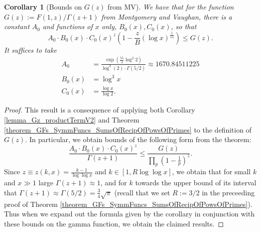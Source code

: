 \documentclass[11pt,reqno,a4letter]{article}
\numberwithin{figure}{section}
\numberwithin{table}{section}
\theoremstyle{plain}
\newtheorem{cor}[theorem]{Corollary}
\numberwithin{theorem}{section}
\theoremstyle{definition}
\begin{document}
\begin{cor}[Bounds on $G(z)$ from MV] 
\label{cor_BoundsOnGz_FromMVBook_initial_stmt_v1} 
We have that for the function $G(z) := F(1, z) / \Gamma(z+1)$ from Montgomery and Vaughan, there 
is a constant $A_0$ and functions of $x$ only, $B_0(x), C_0(x)$, so that 
\[
A_0 \cdot B_0(x) \cdot C_0(x)^{z} \left(1 - \frac{z}{B} (\log x)^{\frac{1}{14}}\right) \leq G(z). 
\]
It suffices to take 
\begin{align*} 
A_0 & = \frac{\exp\left(\frac{55}{4} \log^2 2\right)}{\log^3(2) \cdot \Gamma(5/2)} 
     \approx 1670.84511225 \\ 
B_0(x) & = \log^3 x \\ 
C_0(x) & = \frac{\log x}{\log 2}. 
\end{align*} 
\end{cor}
\begin{proof} 
This result is a consequence of applying both 
Corollary \ref{lemma_Gz_productTermV2} and 
Theorem \ref{theorem_GFs_SymmFuncs_SumsOfRecipOfPowsOfPrimes} to the definition of $G(z)$. 
In particular, we obtain bounds of the following form from the theorem: 
\[
\frac{A_0 \cdot B_0(x) \cdot C_0(x)^{z}}{\Gamma(z+1)} \leq 
     \frac{G(z)}{\prod_p \left(1-\frac{1}{p}\right)^{z}}. 
\]
Since $z \equiv z(k, x) = \frac{k-1}{\log\log x}$ and $k \in [1, R\log\log x]$, we obtain that 
for small $k$ and $x \gg 1$ large $\Gamma(z+1) \approx 1$, and for $k$ towards the upper bound of 
its interval that $\Gamma(z+1) \approx \Gamma(5/2) = \frac{3}{4} \sqrt{\pi}$ 
(recall that we set $R := 3/2$ in the 
preceeding proof of Theorem \ref{theorem_GFs_SymmFuncs_SumsOfRecipOfPowsOfPrimes}). 
Thus when we expand out the formula given by the corollary in conjunction with these bounds on the 
gamma function, we obtain the claimed results. 
\end{proof} 
\end{document}
